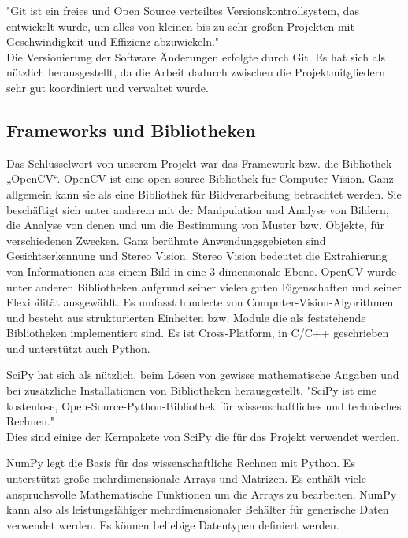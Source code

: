 	
	"Git ist ein freies und Open Source verteiltes Versionskontrollsystem, das
	entwickelt wurde, um alles von kleinen bis zu sehr großen Projekten mit
	Geschwindigkeit und Effizienz abzuwickeln." \cite{Git1} \\
	Die Versionierung der Software Änderungen erfolgte durch Git.
	Es hat sich als nützlich herausgestellt, da die Arbeit dadurch zwischen die
	Projektmitgliedern sehr gut koordiniert und verwaltet wurde. 
	



\subsection{Frameworks und Bibliotheken}


	
	Das Schlüsselwort von unserem Projekt war das Framework bzw. die Bibliothek
	„OpenCV“.
	OpenCV ist eine open-source Bibliothek für Computer Vision. Ganz allgemein
	kann sie als eine Bibliothek für Bildverarbeitung betrachtet werden.
	Sie beschäftigt sich unter anderem mit der Manipulation und Analyse von Bildern,
	die Analyse von denen und um die Bestimmung von Muster bzw. Objekte, für
	verschiedenen Zwecken. Ganz berühmte Anwendungsgebieten sind
	Gesichtserkennung und Stereo Vision. 
	Stereo Vision bedeutet die Extrahierung von Informationen aus einem Bild in eine
	3-dimensionale Ebene. 
	OpenCV wurde unter anderen Bibliotheken aufgrund seiner vielen guten
	Eigenschaften und seiner Flexibilität ausgewählt. Es umfasst hunderte von
	Computer-Vision-Algorithmen und besteht aus strukturierten Einheiten bzw. Module
	die als feststehende Bibliotheken implementiert sind. 
	Es ist Cross-Platform, in C/C++ geschrieben und unterstützt auch Python. 
	\cite{opencv_library}
	
	SciPy hat sich als nützlich, beim Lösen von gewisse mathematische Angaben und
	bei zusätzliche Installationen von Bibliotheken herausgestellt. 
	"SciPy ist eine kostenlose, Open-Source-Python-Bibliothek für wissenschaftliches
	und technisches Rechnen."\cite{2019arXiv190710121V-scipy}
	\\ 
	Dies sind einige der Kernpakete von SciPy die für das Projekt verwendet
	werden.
	
	NumPy legt die Basis für das wissenschaftliche Rechnen mit Python.
	Es unterstützt große mehrdimensionale Arrays und Matrizen. Es enthält viele
	anspruchsvolle Mathematische Funktionen um die Arrays zu bearbeiten.
	NumPy kann also als leistungsfähiger mehrdimensionaler Behälter für generische
	Daten verwendet werden. Es können beliebige Datentypen definiert werden.
	

